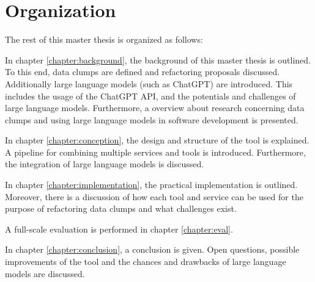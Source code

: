\section{Organization}
The rest of this master thesis is organized as follows:

In chapter \ref{chapter:background}, the background of this master thesis  is outlined. To this end, data clumps are defined and refactoring proposals discussed. Additionally large language models (such as ChatGPT) are introduced. This includes the usage of the ChatGPT \ac{API}, and the potentials and challenges of large language models.  Furthermore, a overview about research  concerning data clumps and using large language models in software development is presented. 

In chapter \ref{chapter:conception}, the design and structure of the tool is explained. A pipeline for combining multiple services and tools is introduced. Furthermore, the integration of large language models is discussed. 

In chapter \ref{chapter:implementation}, the practical implementation is outlined.  Moreover, there is a discussion of how each tool and service can be used for the purpose of refactoring data clumps and what challenges exist. 

A full-scale evaluation is performed in chapter \ref{chapter:eval}.

In chapter \ref{chapter:conclusion}, a conclusion is given. Open questions, possible improvements of the tool and the chances and drawbacks of large language models are discussed.